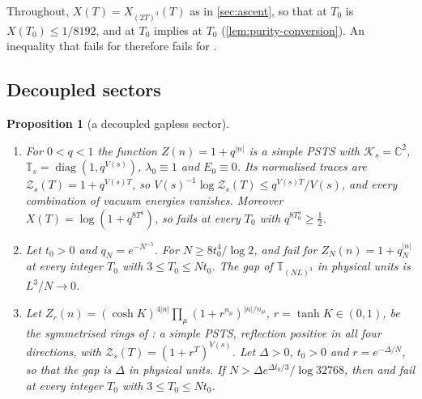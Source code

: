\documentclass[11pt,a4paper]{amsart}
\newtheorem{proposition}[theorem]{Proposition}
\theoremstyle{definition}
\theoremstyle{remark}
\numberwithin{equation}{section}
\newcommand{\C}{\mathbb{C}}          %
\newcommand{\Kspace}{\mathcal{K}}    %
\newcommand{\PSTS}{\textup{PSTS}}          %
\newcommand{\TT}{\mathbb{T}}               %
\newcommand{\Zc}{\mathcal{Z}}              %
\newcommand{\Zs}[2]{\Zc_{#1}(#2)}          %
\newcommand{\XT}[2]{X_{#1}(#2)}            %
\newcommand{\Vol}[1]{V(#1)}                %
\newcommand{\cube}[1]{(2#1)^3}             %
\newcommand{\lzero}{\lambda_0}             %
\newcommand{\xconst}{\frac{1}{8192}}       %
\newcommand{\xconstinl}{1/8192}            %
\newcommand{\Mcirc}{\text{\upshape(M$^{\circ}$)}}   %
\newcommand{\Bcirc}{\text{\upshape(B$^{\circ}$)}}   %
\newcommand{\tzero}{t_0}                   %
\begin{document}
Throughout, $X(T)=\XT{\cube{T}}{T}$ as in \cref{sec:ascent}, so that \Bcirc{} at $T_0$ is $X(T_0)\le\xconstinl$, and \Mcirc{} at $T_0$ implies \Bcirc{} at $T_0$ (\cref{lem:purity-conversion}). An inequality that fails for \Bcirc{} therefore fails for \Mcirc{}.

\subsection{Decoupled sectors}

\begin{proposition}[a decoupled gapless sector]\label{prop:gapless-sector}
\begin{enumerate}[label=\textup{(\alph*)},leftmargin=*]
\item For $0<q<1$ the function $Z(n)=1+q^{|n|}$ is a simple \PSTS{} with $\Kspace_s=\C^2$, $\TT_s=\operatorname{diag}(1,q^{\Vol{s}})$, $\lzero\equiv1$ and $E_0\equiv0$. Its normalised traces are $\Zs{s}{T}=1+q^{\Vol{s}T}$, so $\Vol{s}^{-1}\log\Zs{s}{T}\le q^{\Vol{s}T}/\Vol{s}$, and every combination of vacuum energies vanishes. Moreover $X(T)=\log(1+q^{8T^4})$, so \Bcirc{} fails at every $T_0$ with $q^{8T_0^4}\ge\frac12$.
\item Let $\tzero>0$ and $q_N=e^{-N^{-5}}$. For $N\ge8\tzero^4/\log2$, \Bcirc{} and \Mcirc{} fail for $Z_N(n)=1+q_N^{|n|}$ at every integer $T_0$ with $3\le T_0\le N\tzero$. The gap of $\TT_{(NL)^3}$ in physical units is $L^3/N\to0$.
\item Let $Z_r(n)=(\cosh K)^{4|n|}\prod_{\mu}(1+r^{n_\mu})^{|n|/n_\mu}$, $r=\tanh K\in(0,1)$, be the symmetrised rings of \cite[Proposition~17]{bhattacharjee2026first}: a simple \PSTS{}, reflection positive in all four directions, with $\Zs{s}{T}=(1+r^T)^{\Vol{s}}$. Let $\Delta>0$, $\tzero>0$ and $r=e^{-\Delta/N}$, so that the gap is $\Delta$ in physical units. If $N>\Delta e^{\Delta\tzero/3}/\log32768$, then \Bcirc{} and \Mcirc{} fail at every integer $T_0$ with $3\le T_0\le N\tzero$.
\end{enumerate}
\end{proposition}
\end{document}
